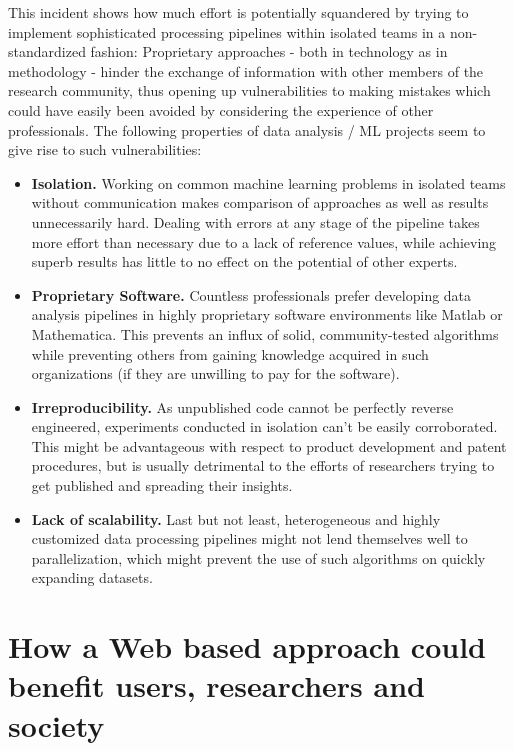 \par

This incident shows how much effort is potentially squandered by trying to implement sophisticated processing pipelines within isolated teams in a non-standardized fashion: Proprietary approaches - both in technology as in methodology - hinder the exchange of information with other members of the research community, thus opening up vulnerabilities to making mistakes which could have easily been avoided by considering the experience of other professionals. The following properties of data analysis / ML projects seem to give rise to such vulnerabilities:

\begin{itemize}
	\item \textbf{Isolation.} Working on common machine learning problems in isolated teams without communication makes comparison of approaches as well as results unnecessarily hard. Dealing with errors at any stage of the pipeline takes more effort than necessary due to a lack of reference values, while achieving superb results has little to no effect on the potential of other experts.
	\item \textbf{Proprietary Software.} Countless professionals prefer developing data analysis pipelines in highly proprietary software environments like Matlab or Mathematica. This prevents an influx of solid, community-tested algorithms while preventing others from gaining knowledge acquired in such organizations (if they are unwilling to pay for the software).
	\item \textbf{Irreproducibility.} As unpublished code cannot be perfectly reverse engineered, experiments conducted in isolation can't be easily corroborated. This might be advantageous with respect to product development and patent procedures, but is usually detrimental to the efforts of researchers trying to get published and spreading their insights.
	\item \textbf{Lack of scalability.} Last but not least, heterogeneous and highly customized data processing pipelines might not lend themselves well to parallelization, which might prevent the use of such algorithms on quickly expanding datasets.
\end{itemize}



\section{How a Web based approach could benefit users, researchers and society}
\label{sect:web_benefits}

